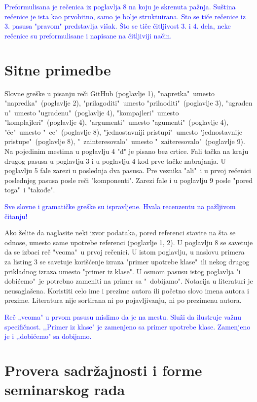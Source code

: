 \documentclass[a4paper]{report}
\newcommand{\odgovor}[1]{\textcolor{blue}{#1}}
\begin{document}
\odgovor{Preformulisana je rečenica iz poglavlja 8 na koju je skrenuta pažnja. Suština rečenice je ista kao prvobitno, samo je bolje struktuirana. Sto se tiče rečenice iz 3. pasusa "pravom" predstavlja višak. Što se tiče čitljivost 3. i 4. dela, neke rečenice su preformulisane i napisane na čitljiviji način.}

\section{Sitne primedbe}
Slovne greške u pisanju reči GitHub (poglavlje 1), "napretka"\ umesto "napredka"\ (poglavlje 2), "prilagoditi"\ umesto "prilaoditi"\ (poglavlje 3), "ugrađen u"\ umesto "ugradenu"\ (poglavlje 4), "kompajleri"\ umesto "komplajleri"\ (poglavlje 4), "argumenti"\ umesto "agumenti"\ (poglavlje 4), "će"\ umesto "\ ce"\ (poglavlje 8), "jednostavniji pristupi"\ umesto "jednostavnije pristupe"\ (poglavlje 8), "\ zainteresovalo"\ umesto "\ zaiteresovalo"\ (poglavlje 9). Na pojedinim mestima u poglavlju 4 "đ" je pisano bez crtice. Fali tačka na kraju drugog pasusa u poglavlju 3 i u poglavlju 4 kod prve tačke nabrajanja. U poglavlju 5 fale zarezi u poslednja dva pasusa. Pre veznika "ali"\ i u prvoj rečenici poslednjeg pasusa posle reči "komponenti". Zarezi fale i u poglavlju 9 posle "pored toga"\ i "takođe".

\odgovor{Sve slovne i gramatičke greške su ispravljene. Hvala recenzentu na pažljivom čitanju!}

Ako želite da naglasite neki izvor podataka, pored referenci stavite na šta se odnose, umesto same upotrebe referenci (poglavlje 1, 2). U poglavlju 8 se savetuje da se izbaci reč "veoma"\ u prvoj rečenici. U istom poglavlju, u naslovu primera za listing 3 se savetuje korišćenje izraza "primer upotrebe klase"\ ili nekog drugog prikladnog izraza umesto "primer iz klase". U osmom pasusu istog poglavlja "i dobićemo"\ je potrebno zameniti na primer sa "\ dobijamo".
Notacija u literaturi je neusaglašena. Koristiti celo ime i prezime autora ili početno slovo imena autora i prezime. Literatura nije sortirana ni po pojavljivanju, ni po prezimenu autora.

\odgovor{Reč ‚‚veoma" u prvom pasusu mislimo da je na mestu. Služi da ilustruje važnu specifičnost. ‚‚Primer iz klase" je zamenjeno sa
primer upotrebe klase. Zamenjeno je i ‚‚dobićemo" sa dobijamo.}

\section{Provera sadržajnosti i forme seminarskog rada}
\end{document}
